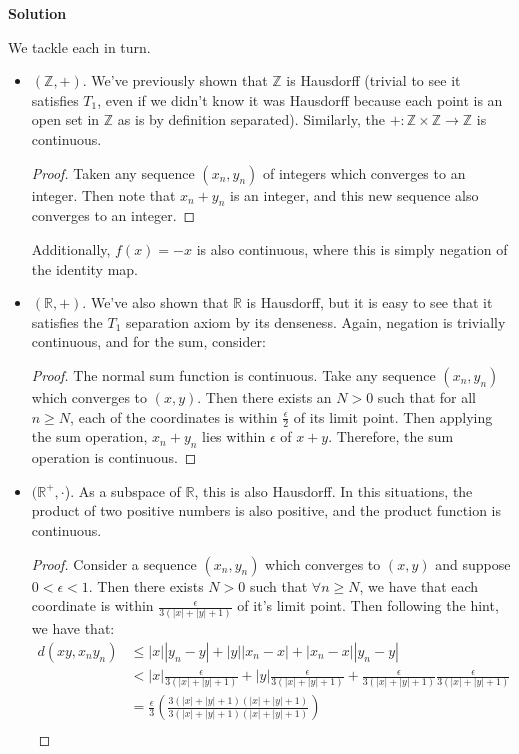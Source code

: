 \documentclass[12pt]{article}
\newcounter{AnswerCounter}
\newcounter{SubAnswerCounter}
\newenvironment{answer}[0]{
  \setcounter{SubAnswerCounter}{1}
  \bigskip
  \textbf{Solution \arabic{AnswerCounter}}
  \\
  \begin{small}
}{
  \end{small}
  \stepcounter{AnswerCounter}
}
\begin{document}
\begin{answer}[Page 145, \# 2]
We tackle each in turn.
\begin{itemize}
\item $(\mathbb{Z}, +)$. We've previously shown that $\mathbb{Z}$ is Hausdorff (trivial to see it satisfies $T_1$, even if we didn't know it was Hausdorff because each point is an open set in $\mathbb{Z}$ as is by definition separated). Similarly, the $+: \mathbb{Z} \times \mathbb{Z} \to \mathbb{Z}$ is continuous.
\begin{proof}
Taken any sequence $(x_n,y_n)$ of integers which converges to an integer. Then note that $x_n + y_n$ is an integer, and this new sequence also converges to an integer.
\end{proof}
Additionally, $f(x) = -x$ is also continuous, where this is simply negation of the identity map.
\item $(\mathbb{R}, +)$. We've also shown that $\mathbb{R}$ is Hausdorff, but it is easy to see that it satisfies the $T_1$ separation axiom by its denseness. Again, negation is trivially continuous, and for the sum, consider:
\begin{proof}
The normal sum function is continuous. Take any sequence $(x_n,y_n)$ which converges to $(x,y)$. Then there exists an $N > 0$ such that for all $n \geq N$, each of the coordinates is within $\frac{\epsilon}{2}$ of its limit point. Then applying the sum operation, $x_n + y_n$ lies within $\epsilon$ of $x + y$. Therefore, the sum operation is continuous.
\end{proof}
\item $(\mathbb{R}^+, \cdot$). As a subspace of $\mathbb{R}$, this is also Hausdorff. In this situations, the product of two positive numbers is also positive, and the product function is continuous.
\begin{proof}
Consider a sequence $(x_n,y_n)$ which converges to $(x,y)$ and suppose $0 < \epsilon < 1$. Then there exists $N > 0$ such that $\forall n \geq N$, we have that each coordinate is within $\frac{\epsilon}{3(|x| + |y| + 1)}$ of it's limit point. Then following the hint, we have that:
\begin{align*}
d(xy, x_ny_n) &\leq |x||y_n - y| + |y||x_n - x| + |x_n - x||y_n - y|\\
&< |x|\frac{\epsilon}{3(|x| + |y| + 1)} + |y|\frac{\epsilon}{3(|x| + |y| + 1)} + \frac{\epsilon}{3(|x| + |y| + 1)}\frac{\epsilon}{3(|x| + |y| + 1)} \\
&= \frac{\epsilon}{3} \left(\frac{3(|x| + |y| + 1)(|x| + |y| + 1)}{3(|x| + |y| + 1)(|x| + |y| + 1)} \right) \\

\end{align*}
\end{proof}
\end{itemize}
\end{answer}
\end{document}
